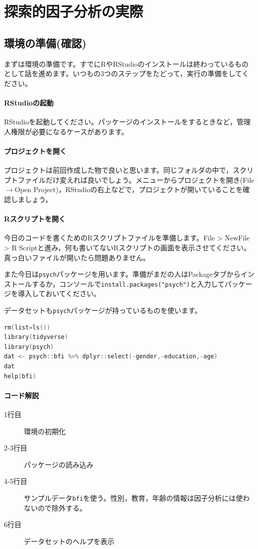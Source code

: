 \documentclass{ltjsbook}
\begin{document}
\section{探索的因子分析の実際}
\subsection{環境の準備(確認)}
まずは環境の準備です。すでにRやRStudioのインストールは終わっているものとして話を進めます。いつもの3つのステップをたどって，実行の準備をしてください。
\paragraph{RStudioの起動}RStudioを起動してください。パッケージのインストールをするときなど，管理人権限が必要になるケースがあります。
\paragraph{プロジェクトを開く}プロジェクトは前回作成した物で良いと思います。同じフォルダの中で，スクリプトファイルだけ変えれば良いでしょう。メニューからプロジェクトを開き(File$\to$Open Project)，RStudioの右上などで，プロジェクトが開いていることを確認しましょう。
\paragraph{Rスクリプトを開く}今日のコードを書くためのRスクリプトファイルを準備します。File > NewFile > R Scriptと進み，何も書いてないRスクリプトの画面を表示させてください。真っ白いファイルが開いたら問題ありません。

また今日は\texttt{psych}パッケージ\textcite{psych}を用います。準備がまだの人はPackageタブからインストールするか，コンソールで\texttt{install.packages("psych")}と入力してパッケージを導入しておいてください。

データセットも\texttt{psych}パッケージが持っているものを使います。
\begin{lstlisting}[language=c++,label={code:10_01},caption={サンプルデータを使う}]
rm(list=ls())
library(tidyverse)
library(psych)
dat <- psych::bfi %>% dplyr::select(-gender,-education,-age)
dat
help(bfi)
\end{lstlisting}

\paragraph{コード解説}
\begin{description}
	\item[1行目] 環境の初期化
	\item[2-3行目] パッケージの読み込み
	\item[4-5行目] サンプルデータ\texttt{bfi}を使う。性別，教育，年齢の情報は因子分析には使わないので除外する。
	\item[6行目] データセットのヘルプを表示
\end{description}
\end{document}
